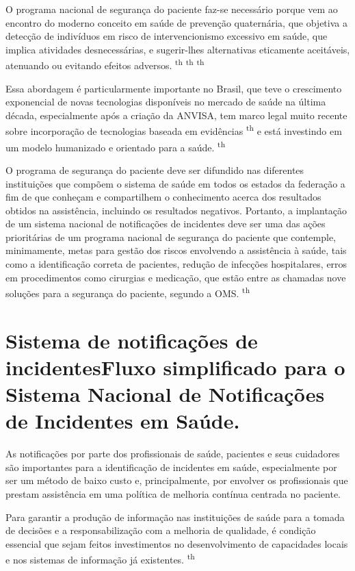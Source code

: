 \documentclass{article}
\begin{document}
O programa nacional de segurança do paciente faz-se necessário porque vem ao
encontro do
moderno conceito em saúde de prevenção quaternária, que objetiva a detecção de
indivíduos em
risco de intervencionismo excessivo em saúde, que implica atividades
desnecessárias, e
sugerir-lhes alternativas eticamente aceitáveis, atenuando ou evitando efeitos
adversos.
\textsuperscript{th}
\textsuperscript{th}
\textsuperscript{th}

Essa abordagem é particularmente importante no Brasil, que teve o crescimento
exponencial
de novas tecnologias disponíveis no mercado de saúde na última década,
especialmente após a
criação da ANVISA, tem marco legal muito recente sobre incorporação de
tecnologias baseada
em evidências \textsuperscript{th}
e está investindo em um modelo humanizado e orientado para a saúde.
\textsuperscript{th}

O programa de segurança do paciente deve ser difundido nas diferentes
instituições que
compõem o sistema de saúde em todos os estados da federação a fim de que
conheçam e
compartilhem o conhecimento acerca dos resultados obtidos na assistência,
incluindo os
resultados negativos. Portanto, a implantação de um sistema nacional de
notificações de
incidentes deve ser uma das ações prioritárias de um programa nacional de
segurança do
paciente que contemple, minimamente, metas para gestão dos riscos envolvendo a
assistência à
saúde, tais como a identificação correta de pacientes, redução de infecções
hospitalares,
erros em procedimentos como cirurgias e medicação, que estão entre as chamadas
nove soluções
para a segurança do paciente, segundo a OMS. \textsuperscript{th}

\section{Sistema de notificações de incidentesFluxo simplificado para o Sistema
Nacional de Notificações de Incidentes em
Saúde.}

As notificações por parte dos profissionais de saúde, pacientes e seus
cuidadores são
importantes para a identificação de incidentes em saúde, especialmente por ser
um método de
baixo custo e, principalmente, por envolver os profissionais que prestam
assistência em uma
política de melhoria contínua centrada no paciente.

Para garantir a produção de informação nas instituições de saúde para a tomada
de decisões
e a responsabilização com a melhoria de qualidade, é condição essencial que
sejam feitos
investimentos no desenvolvimento de capacidades locais e nos sistemas de
informação já
existentes. \textsuperscript{th}
\end{document}

